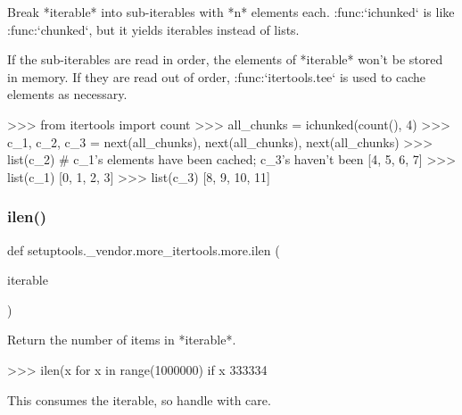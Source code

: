\begin{DoxyVerb}Break *iterable* into sub-iterables with *n* elements each.
:func:`ichunked` is like :func:`chunked`, but it yields iterables
instead of lists.

If the sub-iterables are read in order, the elements of *iterable*
won't be stored in memory.
If they are read out of order, :func:`itertools.tee` is used to cache
elements as necessary.

>>> from itertools import count
>>> all_chunks = ichunked(count(), 4)
>>> c_1, c_2, c_3 = next(all_chunks), next(all_chunks), next(all_chunks)
>>> list(c_2)  # c_1's elements have been cached; c_3's haven't been
[4, 5, 6, 7]
>>> list(c_1)
[0, 1, 2, 3]
>>> list(c_3)
[8, 9, 10, 11]\end{DoxyVerb}
 \mbox{\label{namespacesetuptools_1_1__vendor_1_1more__itertools_1_1more_a7ee771b986b4c83b08e8743d5402df06}} 
\subsubsection{\texorpdfstring{ilen()}{ilen()}}
{\footnotesize\ttfamily def setuptools.\+\_\+vendor.\+more\+\_\+itertools.\+more.\+ilen (\begin{DoxyParamCaption}\item[{}]{iterable }\end{DoxyParamCaption})}

\begin{DoxyVerb}Return the number of items in *iterable*.

    >>> ilen(x for x in range(1000000) if x %
    333334

This consumes the iterable, so handle with care.\end{DoxyVerb}
 \mbox{\label{namespacesetuptools_1_1__vendor_1_1more__itertools_1_1more_a8fabcc02f91e91e6d29119251b3d627a}} 
